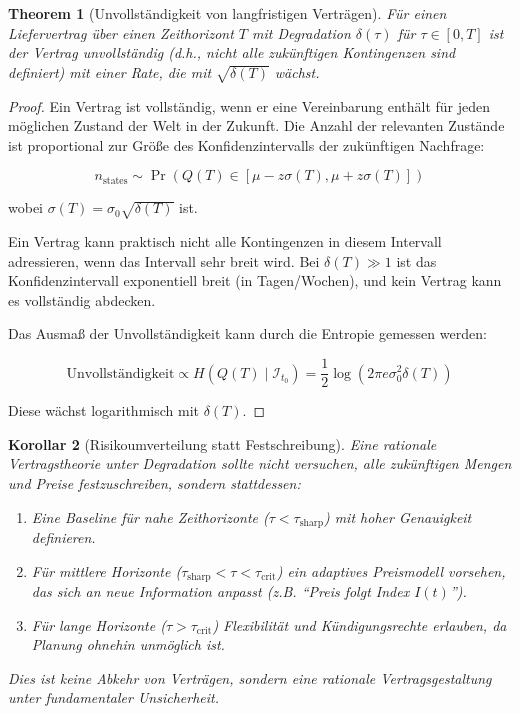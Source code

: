 \documentclass[a4paper, 12pt, twoside, openright]{report}
\newtheorem{theorem}{Theorem}[section]
\newtheorem{corollary}[theorem]{Korollar}
\theoremstyle{definition}
\theoremstyle{definition}
\begin{document}
\begin{theorem}[Unvollständigkeit von langfristigen Verträgen]
\label{thm:contract_incompleteness}
Für einen Liefervertrag über einen Zeithorizont $T$ mit Degradation $\delta(\tau)$ für $\tau \in [0, T]$ ist der Vertrag unvollständig (d.h., nicht alle zukünftigen Kontingenzen sind definiert) mit einer Rate, die mit $\sqrt{\delta(T)}$ wächst.
\end{theorem}

\begin{proof}
Ein Vertrag ist vollständig, wenn er eine Vereinbarung enthält für jeden möglichen Zustand der Welt in der Zukunft. Die Anzahl der relevanten Zustände ist proportional zur Größe des Konfidenzintervalls der zukünftigen Nachfrage:

\begin{equation}
n_{\text{states}} \sim \Pr(Q(T) \in [\mu - z\sigma(T), \mu + z\sigma(T)])
\end{equation}

wobei $\sigma(T) = \sigma_0 \sqrt{\delta(T)}$ ist.

Ein Vertrag kann praktisch nicht alle Kontingenzen in diesem Intervall adressieren, wenn das Intervall sehr breit wird. Bei $\delta(T) \gg 1$ ist das Konfidenzintervall exponentiell breit (in Tagen/Wochen), und kein Vertrag kann es vollständig abdecken.

Das Ausmaß der Unvollständigkeit kann durch die Entropie gemessen werden:

\begin{equation}
\text{Unvollständigkeit} \propto H(Q(T) \mid \mathcal{I}_{t_0}) = \frac{1}{2}\log(2\pi e \sigma_0^2 \delta(T))
\end{equation}

Diese wächst logarithmisch mit $\delta(T)$.
\end{proof}

\begin{corollary}[Risikoumverteilung statt Festschreibung]
Eine rationale Vertragstheorie unter Degradation sollte nicht versuchen, alle zukünftigen Mengen und Preise festzuschreiben, sondern stattdessen:

\begin{enumerate}
  \item Eine \emph{Baseline} für nahe Zeithorizonte ($\tau < \tau_{\text{sharp}}$) mit hoher Genauigkeit definieren.
  
  \item Für mittlere Horizonte ($\tau_{\text{sharp}} < \tau < \tau_{\text{crit}}$) ein \emph{adaptives Preismodell} vorsehen, das sich an neue Information anpasst (z.B. ``Preis folgt Index $I(t)$'').
  
  \item Für lange Horizonte ($\tau > \tau_{\text{crit}}$) Flexibilität und Kündigungsrechte erlauben, da Planung ohnehin unmöglich ist.
\end{enumerate}

Dies ist keine Abkehr von Verträgen, sondern eine \emph{rationale Vertragsgestaltung unter fundamentaler Unsicherheit}.
\end{corollary}
\end{document}
